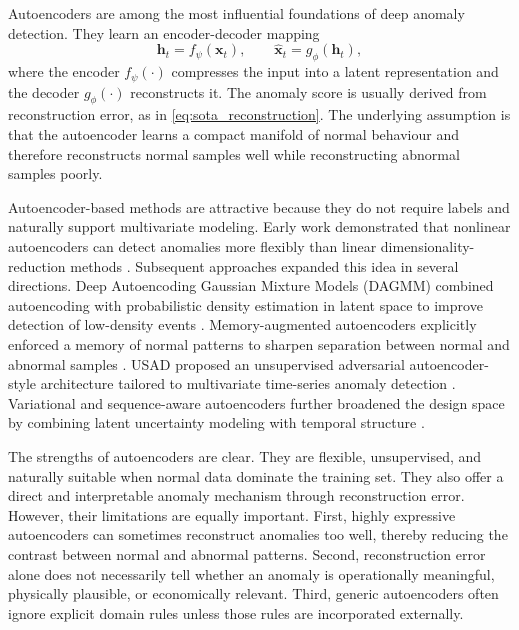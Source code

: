 Autoencoders are among the most influential foundations of deep anomaly detection. They learn an encoder-decoder mapping
\begin{equation}
	\mathbf{h}_t = f_{\psi}(\mathbf{x}_t), \qquad \hat{\mathbf{x}}_t = g_{\phi}(\mathbf{h}_t),
	\label{eq:sota_ae}
\end{equation}
where the encoder $f_{\psi}(\cdot)$ compresses the input into a latent representation and the decoder $g_{\phi}(\cdot)$ reconstructs it. The anomaly score is usually derived from reconstruction error, as in \eqref{eq:sota_reconstruction}. The underlying assumption is that the autoencoder learns a compact manifold of normal behaviour and therefore reconstructs normal samples well while reconstructing abnormal samples poorly.

Autoencoder-based methods are attractive because they do not require labels and naturally support multivariate modeling. Early work demonstrated that nonlinear autoencoders can detect anomalies more flexibly than linear dimensionality-reduction methods \cite{zhou2017robustae}. Subsequent approaches expanded this idea in several directions. Deep Autoencoding Gaussian Mixture Models (DAGMM) combined autoencoding with probabilistic density estimation in latent space to improve detection of low-density events \cite{zong2018dagmm}. Memory-augmented autoencoders explicitly enforced a memory of normal patterns to sharpen separation between normal and abnormal samples \cite{gong2019memorizing}. USAD proposed an unsupervised adversarial autoencoder-style architecture tailored to multivariate time-series anomaly detection \cite{audibert2020usad}. Variational and sequence-aware autoencoders further broadened the design space by combining latent uncertainty modeling with temporal structure \cite{su2019omnianomaly}.

The strengths of autoencoders are clear. They are flexible, unsupervised, and naturally suitable when normal data dominate the training set. They also offer a direct and interpretable anomaly mechanism through reconstruction error. However, their limitations are equally important. First, highly expressive autoencoders can sometimes reconstruct anomalies too well, thereby reducing the contrast between normal and abnormal patterns. Second, reconstruction error alone does not necessarily tell whether an anomaly is operationally meaningful, physically plausible, or economically relevant. Third, generic autoencoders often ignore explicit domain rules unless those rules are incorporated externally.

